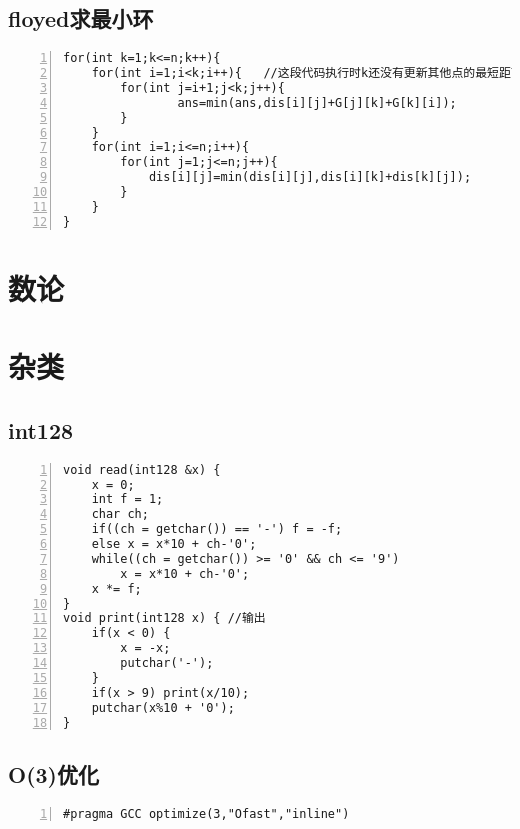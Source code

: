 \subsection{floyed求最小环}
\begin{lstlisting}[language={[ANSI]C},numbers=left]
for(int k=1;k<=n;k++){
    for(int i=1;i<k;i++){	//这段代码执行时k还没有更新其他点的最短距离
        for(int j=i+1;j<k;j++){
                ans=min(ans,dis[i][j]+G[j][k]+G[k][i]);
        }
    }
    for(int i=1;i<=n;i++){
        for(int j=1;j<=n;j++){
            dis[i][j]=min(dis[i][j],dis[i][k]+dis[k][j]);
        }
    }
}
\end{lstlisting}
\section{数论}

\section{杂类}
\subsection{int128}
\begin{lstlisting}[language={[ANSI]C},numbers=left]
void read(int128 &x) {
	x = 0;
	int f = 1;
	char ch;
	if((ch = getchar()) == '-') f = -f;
    else x = x*10 + ch-'0';
    while((ch = getchar()) >= '0' && ch <= '9')
        x = x*10 + ch-'0';
	x *= f;
}
void print(int128 x) { //输出
	if(x < 0) {
		x = -x;
		putchar('-');
	}
    if(x > 9) print(x/10);
    putchar(x%10 + '0');
}
\end{lstlisting}

\subsection{O(3)优化}

\begin{lstlisting}[language={[ANSI]C},numbers=left]
#pragma GCC optimize(3,"Ofast","inline")
\end{lstlisting}

